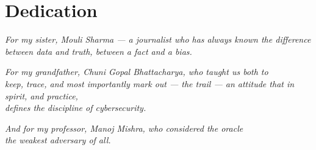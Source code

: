 \chapter*{Dedication}

\begin{center}
\emph{For my sister, Mouli Sharma --- a journalist who has always known the difference} \\
\emph{between data and \emph{truth}, between a fact and a bias.}

\vspace{0.5cm}

\emph{For my grandfather, Chuni Gopal Bhattacharya, who taught us both to} \\
\emph{keep, trace, and most importantly mark out --- the trail --- an attitude that in spirit, and practice,} \\
\emph{defines the discipline of cybersecurity.}

\vspace{0.5cm}

\emph{And for my professor, Manoj Mishra, who considered the oracle} \\
\emph{the weakest adversary of all.}
\end{center}
